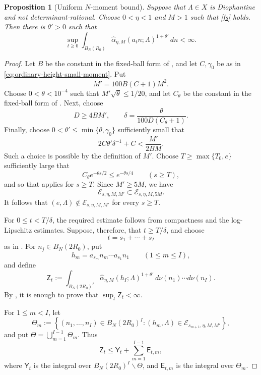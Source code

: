 \documentclass[reqno,11pt]{amsart}
\newtheorem{prop}[prop]{Proposition}
\theoremstyle{definition}
\theoremstyle{remark}
\numberwithin{equation}{section}
\begin{document}
\begin{prop}[Uniform $N$-moment bound]
\label{prop:maintheoremforu}
Suppose that $\Lambda\in X$ is Diophantine and not
determinant-rational. Choose $0<\eta<1$ and $M>1$ such that \eqref{fs}
holds. Then there is $\theta'>0$ such that
\begin{equation}\label{eq:d2-N-average-main}
\sup_{t\ge0}
\int_{B_N(R_0)}
\widehat\alpha_{\eta,M}(a_tn;\Lambda)^{1+\theta'}\,dn
<\infty.
\end{equation}
\end{prop}

\begin{proof}
Let $B$ be the constant in the fixed-ball form of
, and let $C,\gamma_0$ be as in
\eqref{eq:ordinary-height-small-moment}. Put
$$
M'=100B(C+1)M^2.
$$
Choose $0<\theta<10^{-4}$ such that
$M'\sqrt\theta\le1/20$, and let $C_\theta$ be the constant in the
fixed-ball form of . Next, choose
$$
D\ge4BM',
\qquad
\delta=\frac{\theta}{100D(C_\theta+1)}.
$$
Finally, choose
$0<\theta'\le\min\{\theta,\gamma_0\}$ sufficiently small that
\begin{equation}\label{eq:theta-prime-iteration}
2C\theta'\delta^{-1}+C
<
\frac{M'}{2BM}.
\end{equation}
Such a choice is possible by the definition of $M'$. Choose $T\ge\max\{T_0,e\}$ sufficiently large that
$$
C_\theta e^{-\theta s/2}
\le
e^{-\theta s/4}
\qquad
(s\ge T),
$$
and so that  applies for $s\ge T$.
Since $M'\ge5M$, we have
$$
\mathcal E_{s,\eta,M,M'}
\subset
\mathcal E_{s,\eta,M,5M}.
$$
It follows that
$(e,\Lambda)\notin\mathcal E_{s,\eta,M,M'}$ for every $s\ge T$.

For $0\le t<T/\delta$, the required estimate follows from compactness and
the log-Lipschitz estimates. Suppose, therefore, that $t\ge T/\delta$, and
choose
$$
t=s_1+\cdots+s_I
$$
as in .
For $n_j\in B_N(2R_0)$, put
$$
h_m
=
a_{s_m}n_m\cdots a_{s_1}n_1
\qquad
(1\le m\le I),
$$
and define
$$
\mathsf Z_t
:=
\int_{B_N(2R_0)^I}
\widehat\alpha_{\eta,M}(h_I;\Lambda)^{1+\theta'}\,
d\nu(n_1)\cdots d\nu(n_I).
$$
By , it is enough to prove that
$\sup_t\mathsf Z_t<\infty$.

For $1\le m<I$, let
$$
\Theta_m
:=
\left\{
(n_1,\ldots,n_I)\in B_N(2R_0)^I:
(h_m,\Lambda)\in
\mathcal E_{s_{m+1},\eta,M,M'}
\right\},
$$
and put $\Theta=\bigcup_{m=1}^{I-1}\Theta_m$. Thus
$$
\mathsf Z_t
\le
\mathsf Y_t+\sum_{m=1}^{I-1}\mathsf E_{t,m},
$$
where $\mathsf Y_t$ is the integral over
$B_N(2R_0)^I\smallsetminus\Theta$, and $\mathsf E_{t,m}$ is the integral over
$\Theta_m$.


\end{proof}
\end{document}
